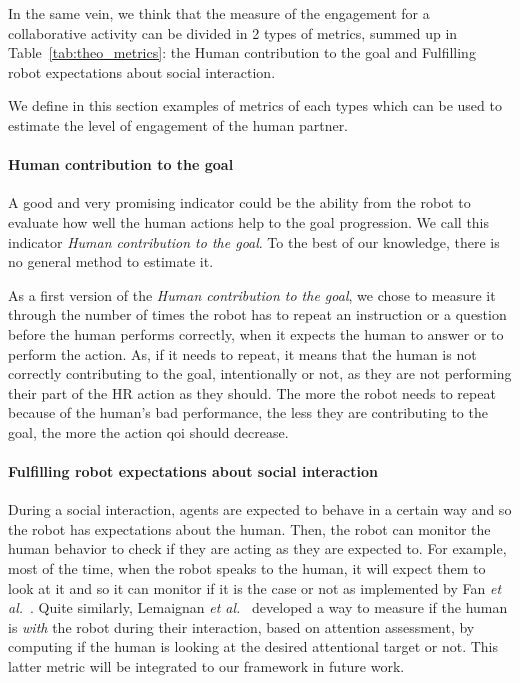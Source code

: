 \documentclass[a4paper,11pt,twoside]{StyleThese}
\begin{document}
In the same vein, we think that the measure of the engagement for a collaborative activity can be divided in 2 types of metrics, summed up in Table~\ref{tab:theo_metrics}: the Human contribution to the goal and Fulfilling robot expectations about social interaction.

We define in this section examples of metrics of each types which can be used to estimate the level of engagement of the human partner. 

\paragraph{Human contribution to the goal}\label{subsubsec:h_contrib}

A good and very promising indicator could be the ability from the robot to evaluate how well the human actions help to the goal progression. We call this indicator \textit{Human contribution to the goal}. To the best of our knowledge, there is no general method to estimate it. 

As a first version of the \textit{Human contribution to the goal}, we chose to measure it through the number of times the robot has to repeat an instruction or a question before the human performs correctly, when it expects the human to answer or to perform the action. As, if it needs to repeat, it means that the human is not correctly contributing to the goal, intentionally or not, as they are not performing their part of the HR action as they should. The more the robot needs to repeat because of the human's bad performance, the less they are contributing to the goal, the more the action \acrshort{qoi} should decrease. 

\paragraph{Fulfilling robot expectations about social interaction}\label{subsubsec:r_exp}
During a social interaction, agents are expected to behave in a certain way and so the robot has expectations about the human. Then, the robot can monitor the human behavior to check if they are acting as they are expected to. For example, most of the time, when the robot speaks to the human, it will expect them to look at it and so it can monitor if it is the case or not as implemented by Fan \textit{et al.}~\cite{fan2017}. Quite similarly, Lemaignan \textit{et al.}~\cite{lemaignan2016} developed a way to measure if the human is \textit{with} the robot during their interaction, based on attention assessment, by computing if the human is looking at the desired attentional target or not. This latter metric will be integrated to our framework in future work.
\end{document}

